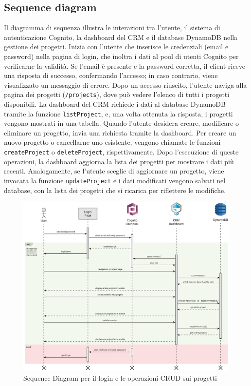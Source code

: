 \documentclass[target=bach,aauheader=,style=]{thud}
\begin{document}
\subsection{Sequence diagram}
Il diagramma di sequenza illustra le interazioni tra l'utente, il sistema di autenticazione Cognito, la dashboard del CRM e il database DynamoDB nella gestione dei progetti. Inizia con l'utente che inserisce le credenziali (email e password) nella pagina di login, che inoltra i dati al pool di utenti Cognito per verificarne la validità. Se l'email è presente e la password corretta, il client riceve una risposta di successo, confermando l'accesso; in caso contrario, viene visualizzato un messaggio di errore. Dopo un accesso riuscito, l'utente naviga alla pagina dei progetti (\texttt{/projects}), dove può vedere l'elenco di tutti i progetti disponibili. La dashboard del CRM richiede i dati al database DynamoDB tramite la funzione \texttt{listProject}, e, una volta ottenuta la risposta, i progetti vengono mostrati in una tabella. Quando l'utente desidera creare, modificare o eliminare un progetto, invia una richiesta tramite la dashboard. Per creare un nuovo progetto o cancellarne uno esistente, vengono chiamate le funzioni \texttt{createProject} o \texttt{deleteProject}, rispettivamente. Dopo l'esecuzione di queste operazioni, la dashboard aggiorna la lista dei progetti per mostrare i dati più recenti. Analogamente, se l'utente sceglie di aggiornare un progetto, viene invocata la funzione \texttt{updateProject} e i dati modificati vengono salvati nel database, con la lista dei progetti che si ricarica per riflettere le modifiche.

\begin{figure}[H]
    \centering
    \includegraphics[width=1\textwidth]{img/diagrammi/sequence.pdf} 
    \caption{Sequence Diagram per il login e le operazioni CRUD sui progetti}
\end{figure}
\end{document}

